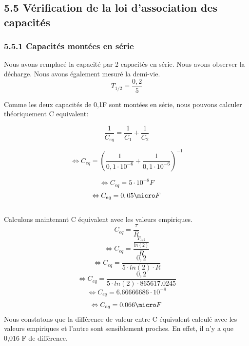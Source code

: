 \documentclass{report}
\begin{document}
\subsection*{5.5 V\'erification de la loi d'association des capacit\'es}
\subsubsection*{5.5.1 Capacit\'es mont\'ees en s\'erie}
\hspace*{0.5cm}
Nous avons remplac\'e la capacit\'e par 2 capacit\'es en s\'erie. Nous avons observer la d\'echarge. Nous avons \'egalement mesur\'e la demi-vie.
\begin{equation}
   T_{1/2} = \frac{0,2}{5}
\end{equation}

Comme les deux capacit\'es de 0,1\micro F sont mont\'ees en s\'erie, nous pouvons calculer th\'eoriquement C equivalent:

\begin{equation}
   \frac{1}{C_{eq}} =  \frac{1}{C_{1}}+\frac{1}{C_{2}}
\end{equation}

\begin{equation}
   \Leftrightarrow C_{eq} =  (\frac{1}{0,1 \cdot 10^{-6}}+\frac{1}{0,1 \cdot 10^{-6}})^{-1}
\end{equation}

\begin{equation}
   \Leftrightarrow C_{eq} = 5 \cdot 10^{-8} F
\end{equation}
\begin{equation}
   \Leftrightarrow C_{eq} = 0,05 \micro F
\end{equation}
\pagebreak
\\
Calculons maintenant C \'equivalent avec les valeurs empiriques.
\begin{equation}
    C_{eq} = \frac{\tau}{R}
\end{equation}
\begin{equation}
    \Leftrightarrow C_{eq} = \frac{\frac{T_{1/2}}{ln(2)}}{R}
\end{equation}
\begin{equation}
    \Leftrightarrow C_{eq} = \frac{0,2}{5 \cdot ln(2) \cdot R}
\end{equation}
\begin{equation}
    \Leftrightarrow C_{eq} = \frac{0,2}{5 \cdot ln(2) \cdot 865617.0245}
\end{equation}
\begin{equation}
    \Leftrightarrow C_{eq} = 6.66666686\cdot 10^{-8}
\end{equation}
\begin{equation}
    \Leftrightarrow C_{eq} = 0.066 \micro F
\end{equation}
Nous constatons que la diff\'erence de valeur entre C \'equivalent calcul\'e avec les valeurs empiriques et l'autre sont sensiblement proches. En effet, il n'y a que 0,016 \micro F de diff\'erence.
\end{document}
